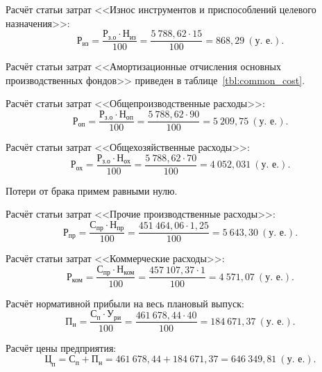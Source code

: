 Расчёт статьи затрат
<<Износ инструментов и приспособлений целевого назначения>>:
\begin{equation*}
\text{Р}_{\text{из}} =
\dfrac{
  \text{Р}_{\text{з.о}} \cdot \text{Н}_{\text{из}}
}{
  100
} =
\dfrac{5~788{,}62 \cdot 15}{100} =
868{,}29~(\text{у.~е.}).
\end{equation*}

Расчёт статьи затрат
<<Амортизационные отчисления основных производственных фондов>>
приведен в таблице~\ref{tbl:common_cost}.


Расчёт статьи затрат
<<Общепроизводственные расходы>>:
\begin{equation*}
\text{Р}_{\text{оп}} =
\dfrac{
  \text{Р}_{\text{з.о}} \cdot \text{Н}_{\text{оп}}
}{
  100
} =
\dfrac{5~788{,}62 \cdot 90}{100} =
5~209{,}75 ~ (\text{у.~е.}).
\end{equation*}


Расчёт статьи затрат
<<Общехозяйственные расходы>>:
\begin{equation*}
\text{Р}_{\text{ох}} =
\dfrac{
  \text{Р}_{\text{з.о}} \cdot \text{Н}_{\text{ох}}
}{
  100
} =
\dfrac{5~788{,}62 \cdot 70}{100} =
4~052{,}031 \: (\text{у.~е.}).
\end{equation*}

Потери от брака примем равными нулю.

Расчёт статьи затрат
<<Прочие производственные расходы>>:
\begin{equation*}
\text{Р}_{\text{пр}} =
\dfrac{
  \text{С}_{\text{пр}} \cdot \text{Н}_{\text{пр}}
}{
  100
} =
\dfrac{451~464{,}06 \cdot 1{,}25}{100} = 5~643{,}30 ~ (\text{у.~е.}).
\end{equation*}

Расчёт статьи затрат
<<Коммерческие расходы>>:
\begin{equation*}
\text{Р}_{\text{ком}} =
\dfrac{
  \text{С}_{\text{пр}} \cdot \text{Н}_{\text{ком}}
}{
  100
} =
\dfrac{457~107{,}37 \cdot 1}{100} = 4~571{,}07 \: (\text{у.~е.}).
\end{equation*}

Расчёт нормативной прибыли на весь плановый выпуск:
\begin{equation*}
\text{П}_{\text{н}} =
\dfrac{
  \text{С}_{\text{п}} \cdot \text{У}_{\text{ри}}
}{
  100
} =
\dfrac{461~678{,}44 \cdot 40}{100} = 184~671{,}37 ~ (\text{у.~е.}).
\end{equation*}

Расчёт цены предприятия:
\begin{equation*}
\text{Ц}_{\text{п}} =
\text{С}_{\text{п}} + \text{П}_{\text{н}} =
461~678{,}44 + 184~671{,}37 = 646~349{,}81 ~ (\text{у.~е.}).
\end{equation*}

